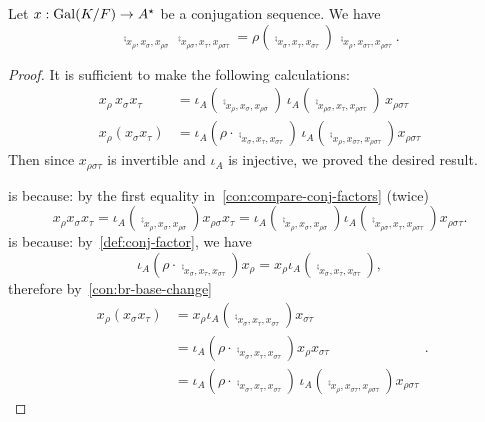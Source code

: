 \begin{lemma}\label{lem:compare-conj-factor-spec}
  Let $x : \operatorname{Gal}(K/F) \to A^{\star}$ be a conjugation sequence. We have
  \[
    \comp_{x_{\rho}, x_{\sigma}, x_{\rho\sigma}}\,\comp_{x_{\rho\sigma},x_{\tau},x_{\rho\sigma\tau}} =
    \rho\left(\comp_{x_{\sigma},x_{\tau},x_{\sigma\tau}}\right)\,\comp_{x_{\rho}, x_{\sigma\tau}, x_{\rho\sigma\tau}}.
  \]
  \leanok
\end{lemma}
\begin{proof}
  It is sufficient to make the following calculations:
  \begin{align}
   x_{\rho}\,x_{\sigma}x_{\tau} &= \iota_{A}\left(\comp_{x_{\rho},x_{\sigma},x_{\rho\sigma}}\right) \, \iota_{A}\left(\comp_{x_{\rho\sigma}, x_{\tau}, x_{\rho\sigma\tau}}\right)\, x_{\rho\sigma\tau}\label{eq:1}\\
   x_{\rho}\left(x_{\sigma}x_{\tau}\right) &= \iota_{A}\left(\rho\cdot\comp_{x_{\sigma},x_{\tau},x_{\sigma\tau}}\right)\,\iota_{A}\left(\comp_{x_{\rho},x_{\sigma\tau},x_{\rho\sigma\tau}}\right) x_{\rho\sigma\tau} \label{eq:2}
 \end{align}
 Then since $x_{\rho\sigma\tau}$ is invertible and $\iota_{A}$ is injective, we proved the desired result.

  is because: by the first equality in~\cref{con:compare-conj-factors} (twice)
 \[
   x_{\rho}x_{\sigma}x_{\tau}=\iota_{A}\left(\comp_{x_{\rho},x_{\sigma}, x_{\rho\sigma}}\right)x_{\rho\sigma}x_{\tau}=\iota_{A}\left(\comp_{x_{\rho},x_{\sigma},x_{\rho\sigma}}\right)\iota_{A}\left(\comp_{x_{\rho\sigma},x_{\tau},x_{\rho\sigma\tau}}\right)x_{\rho\sigma\tau}.
 \]
  is because: by~\cref{def:conj-factor}, we have
 \[\iota_{A}\left(\rho\cdot\comp_{x_{\sigma},x_{\tau},x_{\sigma\tau}}\right)x_{\rho}=x_{\rho}\iota_{A}\left(\comp_{x_{\sigma},x_{\tau},x_{\sigma\tau}}\right),\]
 therefore by~\cref{con:br-base-change}
 \[
   \begin{aligned}
     x_{\rho}\left(x_{\sigma}x_{\tau}\right) &= x_{\rho}\iota_{A}\left(\comp_{x_{\sigma},x_{\tau},x_{\sigma\tau}}\right)x_{\sigma\tau} \\
                                             &= \iota_{A}\left(\rho\cdot \comp_{x_{\sigma},x_{\tau},x_{\sigma\tau}}\right)x_{\rho}x_{\sigma\tau}\\
     &= \iota_{A}\left(\rho\cdot\comp_{x_{\sigma},x_{\tau},x_{\sigma\tau}}\right)\,\iota_{A}\left(\comp_{x_{\rho},x_{\sigma\tau},x_{\rho\sigma\tau}}\right)x_{\rho\sigma\tau}
   \end{aligned}.
 \]
\end{proof}

